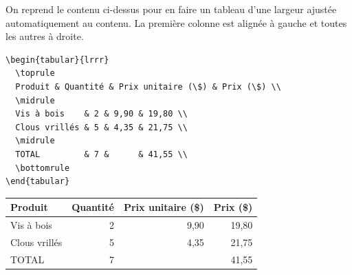 \begin{exemple}
  \label{exemple:tableaux:tabular}
  On reprend le contenu ci-dessus pour en faire un tableau d'une
  largeur ajustée automatiquement au contenu. La première colonne est
  alignée à gauche et toutes les autres à droite.
\begin{lstlisting}
\begin{tabular}{lrrr}
  \toprule
  Produit & Quantité & Prix unitaire (\$) & Prix (\$) \\
  \midrule
  Vis à bois    & 2 & 9,90 & 19,80 \\
  Clous vrillés & 5 & 4,35 & 21,75 \\
  \midrule
  TOTAL         & 7 &      & 41,55 \\
  \bottomrule
\end{tabular}
\end{lstlisting}
  \begin{center}
    \begin{tabular}{lrrr}
      \toprule
      Produit & Quantité & Prix unitaire (\$) & Prix (\$) \\
      \midrule
      Vis à bois    & 2 & 9,90 & 19,80 \\
      Clous vrillés & 5 & 4,35 & 21,75 \\
      \midrule
      TOTAL         & 7 &      & 41,55 \\
      \bottomrule
    \end{tabular}
  \end{center}


\end{exemple}
